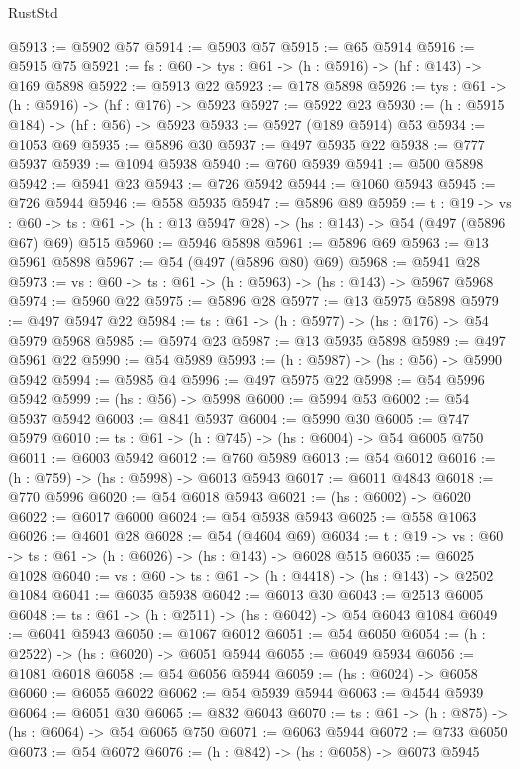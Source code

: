 \begin{lexlean}{RustStd}
\begin{coremodule}
@5913 := @5902 @57
@5914 := @5903 @57
@5915 := @65 @5914
@5916 := @5915 @75
@5921 := {fs : @60} -> {tys : @61} -> (h : @5916) -> (hf : @143) -> @169 @5898
@5922 := @5913 @22
@5923 := @178 @5898
@5926 := {tys : @61} -> (h : @5916) -> (hf : @176) -> @5923
@5927 := @5922 @23
@5930 := (h : @5915 @184) -> (hf : @56) -> @5923
@5933 := @5927 (@189 @5914) @53
@5934 := @1053 @69
@5935 := @5896 @30
@5937 := @497 @5935 @22
@5938 := @777 @5937
@5939 := @1094 @5938
@5940 := @760 @5939
@5941 := @500 @5898
@5942 := @5941 @23
@5943 := @726 @5942
@5944 := @1060 @5943
@5945 := @726 @5944
@5946 := @558 @5935
@5947 := @5896 @89
@5959 := {t : @19} ->
  {vs : @60} -> {ts : @61} -> (h : @13 @5947 @28) -> (hs : @143) -> @54 (@497 (@5896 @67) @69) @515
@5960 := @5946 @5898
@5961 := @5896 @69
@5963 := @13 @5961 @5898
@5967 := @54 (@497 (@5896 @80) @69)
@5968 := @5941 @28
@5973 := {vs : @60} -> {ts : @61} -> (h : @5963) -> (hs : @143) -> @5967 @5968
@5974 := @5960 @22
@5975 := @5896 @28
@5977 := @13 @5975 @5898
@5979 := @497 @5947 @22
@5984 := {ts : @61} -> (h : @5977) -> (hs : @176) -> @54 @5979 @5968
@5985 := @5974 @23
@5987 := @13 @5935 @5898
@5989 := @497 @5961 @22
@5990 := @54 @5989
@5993 := (h : @5987) -> (hs : @56) -> @5990 @5942
@5994 := @5985 @4
@5996 := @497 @5975 @22
@5998 := @54 @5996 @5942
@5999 := (hs : @56) -> @5998
@6000 := @5994 @53
@6002 := @54 @5937 @5942
@6003 := @841 @5937
@6004 := @5990 @30
@6005 := @747 @5979
@6010 := {ts : @61} -> (h : @745) -> (hs : @6004) -> @54 @6005 @750
@6011 := @6003 @5942
@6012 := @760 @5989
@6013 := @54 @6012
@6016 := (h : @759) -> (hs : @5998) -> @6013 @5943
@6017 := @6011 @4843
@6018 := @770 @5996
@6020 := @54 @6018 @5943
@6021 := (hs : @6002) -> @6020
@6022 := @6017 @6000
@6024 := @54 @5938 @5943
@6025 := @558 @1063
@6026 := @4601 @28
@6028 := @54 (@4604 @69)
@6034 := {t : @19} -> {vs : @60} -> {ts : @61} -> (h : @6026) -> (hs : @143) -> @6028 @515
@6035 := @6025 @1028
@6040 := {vs : @60} -> {ts : @61} -> (h : @4418) -> (hs : @143) -> @2502 @1084
@6041 := @6035 @5938
@6042 := @6013 @30
@6043 := @2513 @6005
@6048 := {ts : @61} -> (h : @2511) -> (hs : @6042) -> @54 @6043 @1084
@6049 := @6041 @5943
@6050 := @1067 @6012
@6051 := @54 @6050
@6054 := (h : @2522) -> (hs : @6020) -> @6051 @5944
@6055 := @6049 @5934
@6056 := @1081 @6018
@6058 := @54 @6056 @5944
@6059 := (hs : @6024) -> @6058
@6060 := @6055 @6022
@6062 := @54 @5939 @5944
@6063 := @4544 @5939
@6064 := @6051 @30
@6065 := @832 @6043
@6070 := {ts : @61} -> (h : @875) -> (hs : @6064) -> @54 @6065 @750
@6071 := @6063 @5944
@6072 := @733 @6050
@6073 := @54 @6072
@6076 := (h : @842) -> (hs : @6058) -> @6073 @5945

\end{coremodule}
\end{lexlean}
